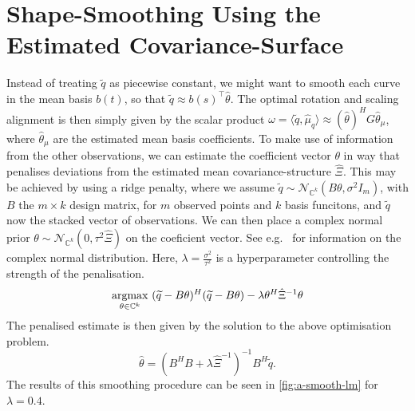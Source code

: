 \section{Shape-Smoothing Using the Estimated Covariance-Surface}
\label{app:a-smooth}
Instead of treating $\widetilde q$ as piecewise constant, we might want to smooth each curve in the mean basis $b(t)$, so that $\widetilde q \approx b(s)^\top \hat\theta$.
The optimal rotation and scaling alignment is then simply given by the scalar product 
$ \omega = \langle \widetilde q, \hat\mu_q \rangle \approx (\hat\theta)^H G \hat\theta_\mu$, where $\hat\theta_\mu$ are the estimated mean basis coefficients.
To make use of information from the other observations, we can estimate the coefficient vector $\theta$ in way that penalises deviations from the estimated mean covariance-structure $\hat\Xi$.
This may be achieved by using a ridge penalty, where we assume $\widetilde q \sim \mathcal{N}_{\mathbb{C}^k}(B \theta, \sigma^2 I_{m})$, with $B$ the $m \times k$ design matrix, for $m$ observed points and $k$ basis funcitons, and $\widetilde q$ now the stacked vector of observations.
We can then place a complex normal prior $\theta \sim \mathcal{N}_{\mathbb{C}^k}(0, \tau^2 \hat\Xi)$ on the coeficient vector.
See e.g.\ \cite{Picinbono1996} for information on the complex normal distribution.
Here, $\lambda = \frac{\sigma^2}{\tau^2}$ is a hyperparameter controlling the strength of the penalisation.
\begin{equation}
  \operatorname*{argmax}_{\theta \in \mathbb{C}^k} \,\, (\widetilde q - B\theta)^H (\widetilde q - B \theta) - \lambda {\theta}^H {\hat\Xi}^{-1} \theta
\end{equation}
The penalised estimate is then given by the solution to the above optimisation problem.
\begin{equation}
  \hat\theta = (B^H B + \lambda {\hat\Xi}^{-1})^{-1} B^H \widetilde q.
\end{equation}
The results of this smoothing procedure can be seen in \cref{fig:a-smooth-lm} for $\lambda = 0.4$.
